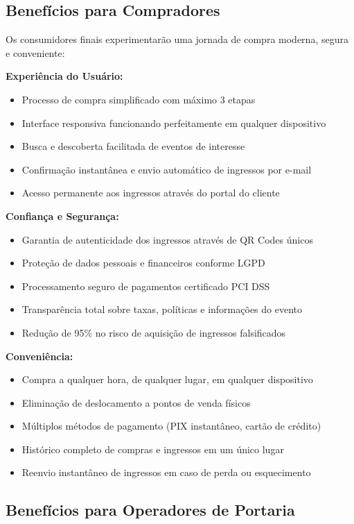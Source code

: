 \subsection{Benefícios para Compradores}

Os consumidores finais experimentarão uma jornada de compra moderna, segura e conveniente:

\textbf{Experiência do Usuário:}
\begin{itemize}
    \item Processo de compra simplificado com máximo 3 etapas
    \item Interface responsiva funcionando perfeitamente em qualquer dispositivo
    \item Busca e descoberta facilitada de eventos de interesse
    \item Confirmação instantânea e envio automático de ingressos por e-mail
    \item Acesso permanente aos ingressos através do portal do cliente
\end{itemize}

\textbf{Confiança e Segurança:}
\begin{itemize}
    \item Garantia de autenticidade dos ingressos através de QR Codes únicos
    \item Proteção de dados pessoais e financeiros conforme LGPD
    \item Processamento seguro de pagamentos certificado PCI DSS
    \item Transparência total sobre taxas, políticas e informações do evento
    \item Redução de 95\% no risco de aquisição de ingressos falsificados
\end{itemize}

\textbf{Conveniência:}
\begin{itemize}
    \item Compra a qualquer hora, de qualquer lugar, em qualquer dispositivo
    \item Eliminação de deslocamento a pontos de venda físicos
    \item Múltiplos métodos de pagamento (PIX instantâneo, cartão de crédito)
    \item Histórico completo de compras e ingressos em um único lugar
    \item Reenvio instantâneo de ingressos em caso de perda ou esquecimento
\end{itemize}

\subsection{Benefícios para Operadores de Portaria}

